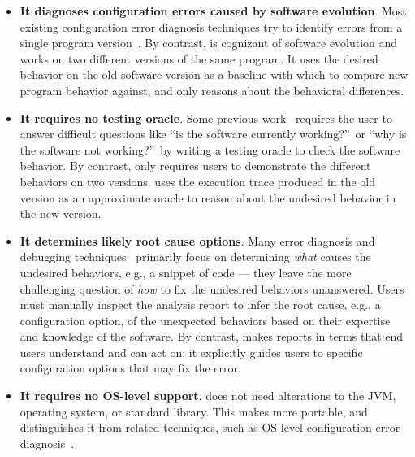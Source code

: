 \begin{itemize}
\item \textbf{It diagnoses configuration errors caused by software evolution}.
Most existing configuration error diagnosis techniques
try to identify errors from a single program
version~\cite{Wang:2004:AMT, Rabkin:2011:PPC, Whitaker:2004:CDS,
Zhang:2013:ADS, Attariyan:2010:ACT, Su:2007:AIC, Attariyan:2008:UCD, xray}.
By contrast, \ourtool is cognizant of software evolution and
works on two different versions of the same program. 
It uses the desired behavior on the old software version
as a baseline with which to compare new program behavior against, and only
reasons about the behavioral differences.

\item \textbf{It requires no testing oracle}.
Some previous work~\cite{Rabkin:2011:PPC, Whitaker:2004:CDS,
Attariyan:2010:ACT, Su:2007:AIC} requires the user to answer difficult
questions like ``is the software currently working?''\ or ``why is the
software not working?''\ by writing a testing
oracle to check the software behavior. By contrast,
\ourtool only requires users to
demonstrate the different behaviors on two versions.
\ourtool uses the execution trace produced in the old
version as an approximate oracle to
reason about the undesired behavior in the new version.

\item \textbf{It determines likely root cause options}.
Many error diagnosis and debugging techniques~\cite{dd, autoflow}
primarily focus on
determining \textit{what} causes the undesired behaviors, e.g.,
a snippet of code --- they leave the more challenging
question of \textit{how} to fix the undesired behaviors
unanswered.  Users must manually inspect the analysis
report to infer
the root cause, e.g., a configuration option,
of the unexpected behaviors 
based on their expertise and knowledge of the software.
By contrast, \ourtool makes reports in terms that 
end users understand and can act on:  it explicitly guides users to specific
configuration options that may fix the error.

\item \textbf{It requires no OS-level support}. \ourtool
does not need alterations to the JVM, operating system, or
standard library. This makes \ourtool more portable, and
distinguishes it from related techniques, such as
OS-level configuration error diagnosis~\cite{Whitaker:2004:CDS, Su:2007:AIC}.

\end{itemize}

